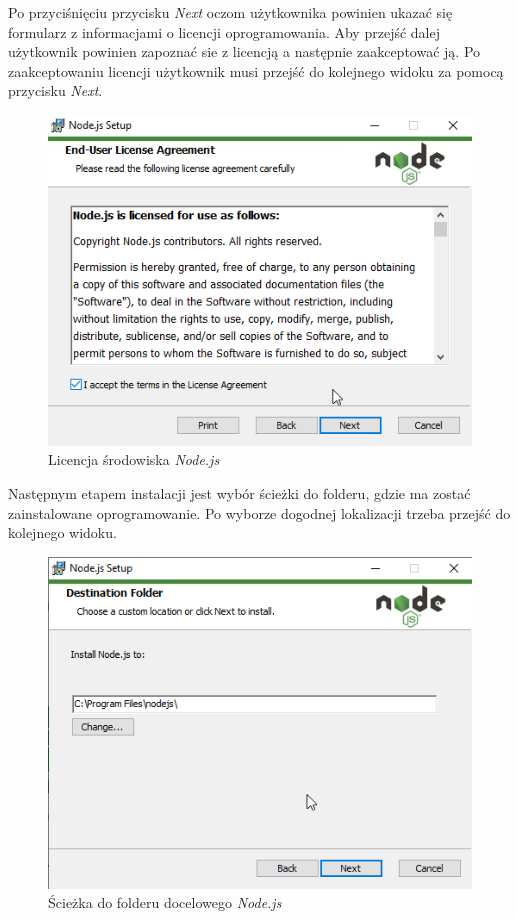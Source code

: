 \documentclass[a4paper,twoside,12pt]{book}
\begin{document}
{Po przyciśnięciu przycisku \textit{Next} oczom użytkownika powinien ukazać się formularz z informacjami o licencji oprogramowania. Aby przejść dalej użytkownik powinien zapoznać sie z licencją a następnie zaakceptować ją. Po zaakceptowaniu licencji użytkownik musi przejść do kolejnego widoku za pomocą przycisku \textit{Next}.
\begin{figure}[h!]
	\centering
	\includegraphics[width=0.65\linewidth]{../zrzuty_ekranu/instalacja_nodejs/node2}
	\caption{Licencja środowiska \textit{Node.js}}
	\label{fig:node2}
\end{figure}
\FloatBarrier

\newpage
Następnym etapem instalacji jest wybór ścieżki do folderu, gdzie ma zostać zainstalowane oprogramowanie. Po wyborze dogodnej lokalizacji trzeba przejść do kolejnego widoku.
\begin{figure}[h!]
	\centering
	\includegraphics[width=0.6\linewidth]{../zrzuty_ekranu/instalacja_nodejs/node3}
	\caption{Ścieżka do folderu docelowego \textit{Node.js}}
	\label{fig:node3}
\end{figure}


}
\end{document}
